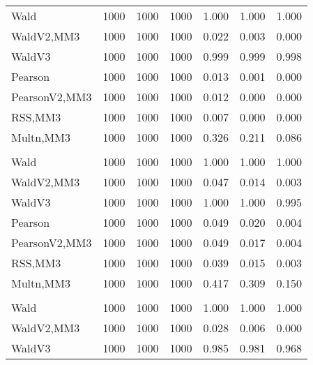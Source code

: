 \documentclass[
]{article}
\begin{document}
\begin{table}[H]
{\begin{tabular}[t]{lrrrrrr}
\hspace{1em}Wald & 1000 & 1000 & 1000 & 1.000 & 1.000 & \vphantom{2} 1.000\\
\hspace{1em}WaldV2,MM3 & 1000 & 1000 & 1000 & 0.022 & 0.003 & 0.000\\
\hspace{1em}WaldV3 & 1000 & 1000 & 1000 & 0.999 & 0.999 & 0.998\\
\hspace{1em}Pearson & 1000 & 1000 & 1000 & 0.013 & 0.001 & 0.000\\
\hspace{1em}PearsonV2,MM3 & 1000 & 1000 & 1000 & 0.012 & 0.000 & 0.000\\
\hspace{1em}RSS,MM3 & 1000 & 1000 & 1000 & 0.007 & 0.000 & 0.000\\
\hspace{1em}Multn,MM3 & 1000 & 1000 & 1000 & 0.326 & 0.211 & 0.086\\
\addlinespace[0.3em]
\multicolumn{7}{l}{\textbf{2F 10V}}\\
\hspace{1em}Wald & 1000 & 1000 & 1000 & 1.000 & 1.000 & \vphantom{1} 1.000\\
\hspace{1em}WaldV2,MM3 & 1000 & 1000 & 1000 & 0.047 & 0.014 & 0.003\\
\hspace{1em}WaldV3 & 1000 & 1000 & 1000 & 1.000 & 1.000 & 0.995\\
\hspace{1em}Pearson & 1000 & 1000 & 1000 & 0.049 & 0.020 & 0.004\\
\hspace{1em}PearsonV2,MM3 & 1000 & 1000 & 1000 & 0.049 & 0.017 & 0.004\\
\hspace{1em}RSS,MM3 & 1000 & 1000 & 1000 & 0.039 & 0.015 & 0.003\\
\hspace{1em}Multn,MM3 & 1000 & 1000 & 1000 & 0.417 & 0.309 & 0.150\\
\addlinespace[0.3em]
\multicolumn{7}{l}{\textbf{3F 15V}}\\
\hspace{1em}Wald & 1000 & 1000 & 1000 & 1.000 & 1.000 & 1.000\\
\hspace{1em}WaldV2,MM3 & 1000 & 1000 & 1000 & 0.028 & 0.006 & 0.000\\
\hspace{1em}WaldV3 & 1000 & 1000 & 1000 & 0.985 & 0.981 & 0.968\\

\end{tabular}}
\end{table}
\end{document}
